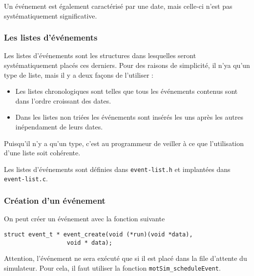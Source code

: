    Un événement est également caractérisé par une date, mais celle-ci
n'est pas systématiquement significative.

%
\subsubsection{Les listes d'événements}

   Les listes d'événements sont les structures dans lesquelles seront
systématiquement placés ces derniers. Pour des raisons de simplicité,
il n'ya qu'un type de liste, mais il y a deux façons de l'utiliser :

\begin{itemize}
   \item Les listes chronologiques sont telles que tous les événements
     contenus sont dans l'ordre croissant des dates.
   \item Dans les listes non triées les événements sont insérés les
     uns après les autres inépendament de leurs dates.
\end{itemize}

   Puisqu'il n'y a qu'un type, c'est au programmeur de veiller à ce
que l'utilisation d'une liste soit cohérente.

   Les listes d'événements sont définies dans {\tt event-list.h} et
implantées dans {\tt event-list.c}.  

%
\subsubsection{Création d'un événement}
 
   On peut créer un événement avec la fonction suivante 

\begin{verbatim}
struct event_t * event_create(void (*run)(void *data),
			      void * data);
\end{verbatim}

   Attention, l'événement ne sera exécuté que si il est placé dans la
file d'attente du simulateur. Pour cela, il faut utiliser la fonction
{\tt motSim\_scheduleEvent}. 

%

